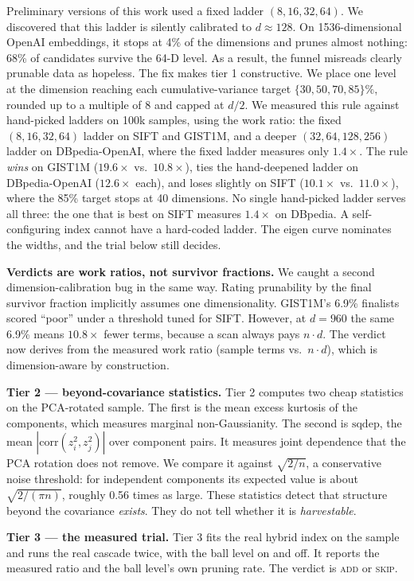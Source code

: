 \documentclass[sigconf, nonacm]{acmart}
\begin{document}
Preliminary
versions of this work used a fixed ladder $(8,16,32,64)$. We discovered
that this ladder is silently calibrated to $d \approx 128$. On
1536-dimensional OpenAI embeddings, it stops at 4\% of the dimensions and
prunes almost nothing: 68\% of candidates survive the 64-D level. As a
result, the funnel misreads clearly prunable data as hopeless. The fix
makes tier 1 constructive. We place one level at the dimension reaching
each cumulative-variance target $\{30, 50, 70, 85\}\%$, rounded up to a
multiple of 8 and capped at $d/2$. We measured this rule against
hand-picked ladders on 100k samples, using the work ratio: the fixed
$(8,16,32,64)$ ladder on SIFT and GIST1M, and a deeper $(32,64,128,256)$
ladder on DBpedia-OpenAI, where the fixed ladder measures only
$1.4\times$. The rule \emph{wins} on GIST1M ($19.6\times$ vs.\
$10.8\times$), ties the hand-deepened ladder on DBpedia-OpenAI
($12.6\times$ each), and loses slightly on SIFT ($10.1\times$ vs.\
$11.0\times$), where the 85\% target stops at 40 dimensions. No single
hand-picked ladder serves all three: the one that is best on SIFT
measures $1.4\times$ on DBpedia. A self-configuring index cannot have a
hard-coded ladder. The eigen curve nominates the widths, and the trial
below still decides.

\textbf{Verdicts are work ratios, not survivor fractions.} We caught a
second dimension-calibration bug in the same way. Rating prunability by
the final survivor fraction implicitly assumes one dimensionality.
GIST1M's 6.9\% finalists scored ``poor'' under a threshold tuned for
SIFT. However, at $d=960$ the same 6.9\% means $10.8\times$ fewer terms,
because a scan always pays $n \cdot d$. The verdict now derives from the
measured work ratio (sample terms vs.\ $n \cdot d$), which is
dimension-aware by construction.

\textbf{Tier 2 --- beyond-covariance statistics.} Tier 2 computes two
cheap statistics on the PCA-rotated sample. The first is the mean excess
kurtosis of the components, which measures marginal non-Gaussianity. The
second is $\mathrm{sqdep}$, the mean $|\mathrm{corr}(z_i^2, z_j^2)|$ over
component pairs. It measures joint dependence that the PCA rotation does
not remove. We compare it against $\sqrt{2/n}$, a conservative noise
threshold: for independent components its expected value is about
$\sqrt{2/(\pi n)}$, roughly 0.56 times as large. These statistics detect that structure beyond the covariance \emph{exists}.
They do not tell whether it is \emph{harvestable}.

\textbf{Tier 3 --- the measured trial.} Tier 3 fits the real hybrid index
on the sample and runs the real cascade twice, with the ball level on and
off. It reports the measured ratio and the ball level's own pruning rate.
The verdict is \textsc{add} or \textsc{skip}.
\end{document}
